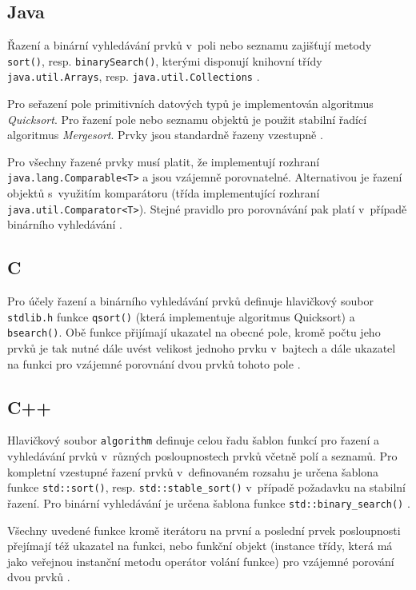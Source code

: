 \documentclass[onepage, a4paper, 12pt]{bakalarka}
\begin{document}
\subsection{Java}
Řazení a binární vyhledávání prvků v~poli nebo seznamu zajišťují metody \texttt{sort()}, resp. \texttt{binarySearch()}, kterými disponují knihovní třídy \texttt{java.util\-.Arrays}, resp. \texttt{java.util.Collections} \cite{java-guide-arrays, java-guide-collections}.\par
Pro seřazení pole primitivních datových typů je implementován algoritmus \textit{Quicksort}. Pro řazení pole nebo seznamu objektů je použit stabilní řadící algoritmus \textit{Mergesort}. Prvky jsou standardně řazeny vzestupně \cite{java-guide-arrays, java-guide-collections}.\par
Pro všechny řazené prvky musí platit, že implementují rozhraní \texttt{java\-.lang.Comparable<T>} a jsou vzájemně porovnatelné. Alternativou je řazení objektů s~využitím komparátoru (třída implementující rozhraní \texttt{java.util\-.Comparator<T>}). Stejné pravidlo pro porovnávání pak platí v~případě binárního vyhledávání \cite{java-guide-arrays, java-guide-collections, java-guide-comparable, java-guide-comparator}.\par

\subsection{C}
Pro účely řazení a binárního vyhledávání prvků definuje hlavičkový soubor \texttt{stdlib.h} funkce \texttt{qsort()} (která implementuje algoritmus Quicksort) a \texttt{bsearch()}. Obě funkce přijímají ukazatel na obecné pole, kromě počtu jeho prvků je tak nutné dále uvést velikost jednoho prvku v~bajtech a dále ukazatel na funkci pro vzájemné porovnání dvou prvků tohoto pole \cite{cpp-guide-qsort, cpp-guide-bsearch}.

\subsection{C++}
Hlavičkový soubor \texttt{algorithm} definuje celou řadu šablon funkcí pro řazení a vyhledávání prvků v~různých posloupnostech prvků včetně polí a seznamů. Pro kompletní vzestupné řazení prvků v~definovaném rozsahu je určena šablona funkce \texttt{std::sort()}, resp. \texttt{std::stable\_sort()} v~případě požadavku na stabilní řazení. Pro binární vyhledávání je určena šablona funkce \newline\texttt{std::binary\_search()} \cite{cpp-guide-stdsort, cpp-guide-stdstablesort, cpp-guide-stdbinarysearch}.\par
Všechny uvedené funkce kromě iterátoru na první a poslední prvek posloupnosti přejímají též ukazatel na funkci, nebo funkční objekt (instance třídy, která má jako veřejnou instanční metodu operátor volání funkce) pro vzájemné porování dvou prvků \cite{cpp-guide-stdsort, cpp-guide-stdstablesort, cpp-guide-stdbinarysearch}.
\end{document}
